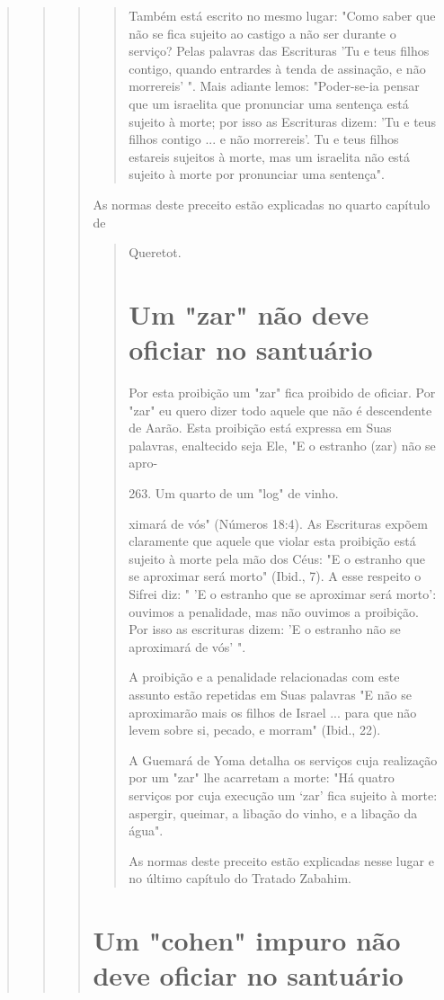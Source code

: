 \begin{quote}
\begin{quote}
\begin{quote}
\begin{quote}
Também está escrito no mesmo lugar: "Como saber que não se fica sujeito
ao castigo a não ser durante o serviço? Pelas palavras das Escrituras
'Tu e teus filhos contigo, quando entrardes à tenda de assinação, e não
morrereis' ". Mais adiante lemos: "Poder-se-ia pensar que um israelita
que pronunciar uma sentença está sujeito à morte; por isso as Escrituras
dizem: 'Tu e teus filhos con­tigo ... e não morrereis'. Tu e teus filhos
estareis sujeitos à morte, mas um israe­lita não está sujeito à morte
por pronunciar uma sentença".
\end{quote}

As normas deste preceito estão explicadas no quarto capítulo de

\begin{quote}
Queretot.

\section{Um "zar" não deve oficiar no santuário}

Por esta proibição um "zar" fica proibido de oficiar. Por "zar" eu quero
dizer todo aquele que não é descendente de Aarão. Esta proibição está
expressa em Suas palavras, enaltecido seja Ele, "E o estranho (zar) não
se apro-

263. Um quarto de um "log" de vinho.


ximará de vós" (Números 18:4). As Escrituras expõem claramente que
aquele que violar esta proibição está sujeito à morte pela mão dos Céus:
"E o estranho que se aproximar será morto" (Ibid., 7). A esse respeito o
Sifrei diz: " 'E o es­tranho que se aproximar será morto': ouvimos a
penalidade, mas não ouvimos a proibição. Por isso as escrituras dizem:
'E o estranho não se aproximará de vós' ".

A proibição e a penalidade relacionadas com este assunto estão
re­petidas em Suas palavras "E não se aproximarão mais os filhos de
Israel ... para que não levem sobre si, pecado, e morram" (Ibid., 22).

A Guemará de Yoma detalha os serviços cuja realização por um "zar" lhe
acarretam a morte: "Há quatro serviços por cuja execução um `zar' fica
su­jeito à morte: aspergir, queimar, a libação do vinho, e a libação da
água".

As normas deste preceito estão explicadas nesse lugar e no último
capítulo do Tratado Zabahim.
\end{quote}

\section{Um "cohen" impuro não deve oficiar no santuário}


\end{quote}
\end{quote}
\end{quote}
